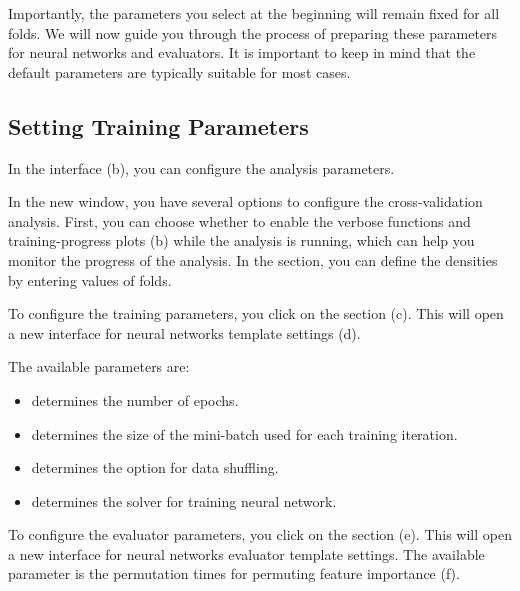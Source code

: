 \documentclass[justified]{tufte-handout}
\begin{document}
{Importantly, the parameters you select at the beginning will remain fixed for all folds. We will now guide you through the process of preparing these parameters for neural networks and evaluators. It is important to keep in mind that the default parameters are typically suitable for most cases.

\subsection{Setting Training Parameters}

In the  interface (b), you can configure the analysis parameters.

In the new window, you have several options to configure the cross-validation analysis. First, you can choose whether to enable the verbose functions and training-progress plots (b) while the analysis is running, which can help you monitor the progress of the analysis. 
In the  section, you can define the densities by entering values of folds.

To configure the training parameters, you click on the section  (c). This will open a new interface for neural networks template settings (d). 

The available parameters are:
\begin{itemize}
	\item {} determines the number of epochs.
	\item {} determines the size of the mini-batch used for each training iteration.
	\item {} determines the option for data shuffling.
	\item {} determines the solver for training neural network.
\end{itemize}

To configure the evaluator parameters, you click on the section  (e). This will open a new interface for neural networks evaluator template settings. 
The available parameter is the permutation times for permuting feature importance (f).

}
\end{document}
